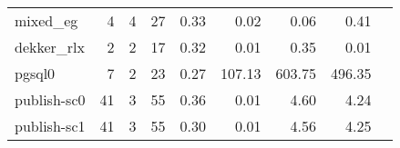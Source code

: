 {\begin{tabular}{l|r|r|r|r|r|r|r|l}
mixed\_eg                                   & 4                                                                                                 & 4                                                                                                & 27                                                                                                                   & 0.33                            & 0.02                    & {\color[HTML]{00009B} 0.06}    & 0.41                       &                                                         \\
dekker\_rlx                                 & 2                                                                                                 & 2                                                                                                & 17                                                                                                                   & 0.32                            & 0.01                    & {\color[HTML]{00009B} 0.35}    & 0.01                       														\\
pgsql0                                      & 7                                                                                                 & 2                                                                                                & 23                                                                                                                   & 0.27                            & 107.13                  & {\color[HTML]{00009B} 603.75}  & 496.35                     \\
publish-sc0                                 & 41                                                                                                & 3                                                                                                & 55                                                                                                                   & 0.36                            & 0.01                    & {\color[HTML]{00009B} 4.60}    & 4.24                       \\
publish-sc1                                 & 41                                                                                                & 3                                                                                                & 55                                                                                                                   & 0.30                            & 0.01                    & {\color[HTML]{00009B} 4.56}    & 4.25                       \\

\end{tabular}}

